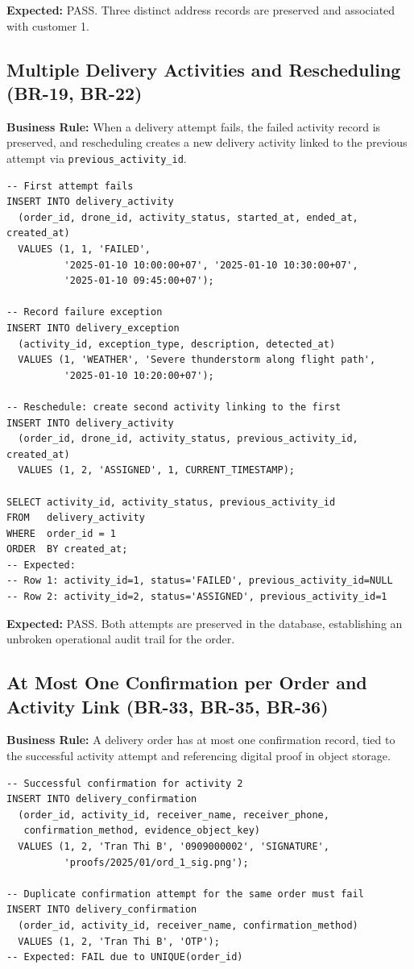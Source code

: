 \textbf{Expected:} PASS. Three distinct address records are preserved and associated with customer 1.

\subsection{Multiple Delivery Activities and Rescheduling (BR-19, BR-22)}

\textbf{Business Rule:} When a delivery attempt fails, the failed activity record is preserved, and rescheduling creates a new delivery activity linked to the previous attempt via \texttt{previous\_activity\_id}.

\begin{verbatim}
-- First attempt fails
INSERT INTO delivery_activity
  (order_id, drone_id, activity_status, started_at, ended_at, created_at)
  VALUES (1, 1, 'FAILED',
          '2025-01-10 10:00:00+07', '2025-01-10 10:30:00+07',
          '2025-01-10 09:45:00+07');

-- Record failure exception
INSERT INTO delivery_exception
  (activity_id, exception_type, description, detected_at)
  VALUES (1, 'WEATHER', 'Severe thunderstorm along flight path',
          '2025-01-10 10:20:00+07');

-- Reschedule: create second activity linking to the first
INSERT INTO delivery_activity
  (order_id, drone_id, activity_status, previous_activity_id, created_at)
  VALUES (1, 2, 'ASSIGNED', 1, CURRENT_TIMESTAMP);

SELECT activity_id, activity_status, previous_activity_id
FROM   delivery_activity
WHERE  order_id = 1
ORDER  BY created_at;
-- Expected:
-- Row 1: activity_id=1, status='FAILED', previous_activity_id=NULL
-- Row 2: activity_id=2, status='ASSIGNED', previous_activity_id=1
\end{verbatim}

\textbf{Expected:} PASS. Both attempts are preserved in the database, establishing an unbroken operational audit trail for the order.

\subsection{At Most One Confirmation per Order and Activity Link (BR-33, BR-35, BR-36)}

\textbf{Business Rule:} A delivery order has at most one confirmation record, tied to the successful activity attempt and referencing digital proof in object storage.

\begin{verbatim}
-- Successful confirmation for activity 2
INSERT INTO delivery_confirmation
  (order_id, activity_id, receiver_name, receiver_phone,
   confirmation_method, evidence_object_key)
  VALUES (1, 2, 'Tran Thi B', '0909000002', 'SIGNATURE',
          'proofs/2025/01/ord_1_sig.png');

-- Duplicate confirmation attempt for the same order must fail
INSERT INTO delivery_confirmation
  (order_id, activity_id, receiver_name, confirmation_method)
  VALUES (1, 2, 'Tran Thi B', 'OTP');
-- Expected: FAIL due to UNIQUE(order_id)
\end{verbatim}

